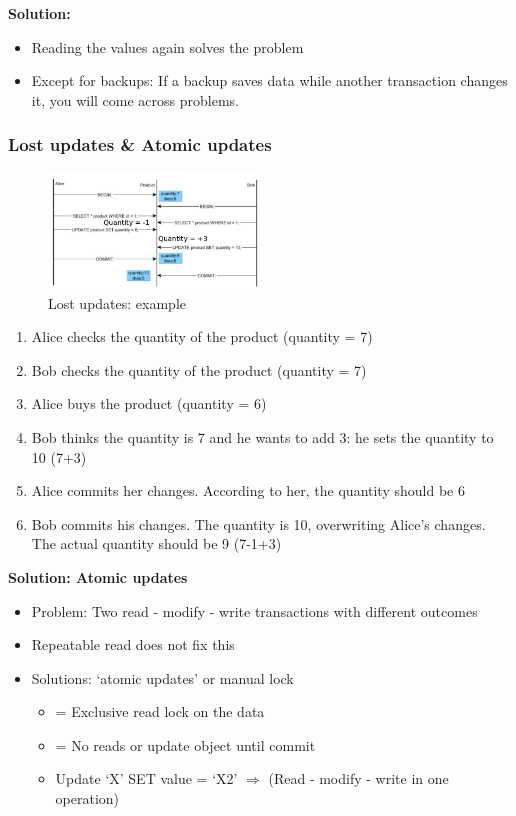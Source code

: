 \documentclass{article}
\begin{document}
\textbf{Solution:}

\begin{itemize}
    \item Reading the values again solves the problem
    \item Except for backups: If a backup saves data while another transaction changes it, you will come across problems.
\end{itemize}


\subsubsection{Lost updates \& Atomic updates}

\begin{figure}[H]
    \centering
    \includegraphics[width=0.5\textwidth]{lost-updates-atomic-updates.png}
    \caption{Lost updates: example}
\end{figure}

\begin{enumerate}
    \item Alice checks the quantity of the product (quantity = 7)
    \item Bob checks the quantity of the product (quantity = 7)
    \item Alice buys the product (quantity = 6)
    \item Bob thinks the quantity is 7 and he wants to add 3: he sets the quantity to 10 (7+3)
    \item Alice commits her changes. According to her, the quantity should be 6
    \item Bob commits his changes. The quantity is 10, overwriting Alice's changes. The actual quantity should be 9 (7-1+3)
\end{enumerate}

\textbf{Solution: Atomic updates}

\begin{itemize}
    \item Problem: Two read - modify - write transactions with different outcomes
    \item Repeatable read does not fix this
    \item Solutions: `atomic updates' or manual lock
    \begin{itemize}
        \item = Exclusive read lock on the data
        \item = No reads or update object until commit
        \item Update `X' SET value = `X2' $\Rightarrow$ (Read - modify - write in one operation)
    \end{itemize}
\end{itemize}
\end{document}
